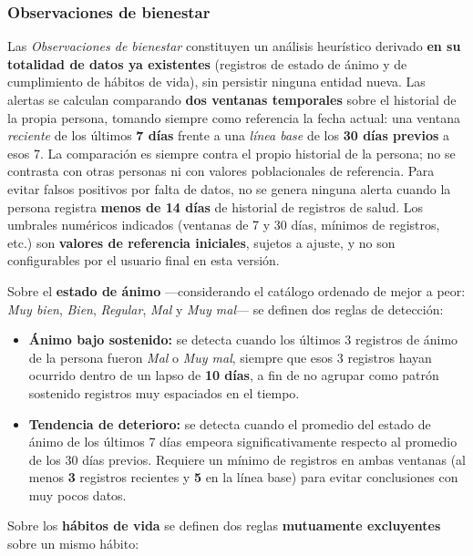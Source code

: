 \documentclass[a4paper,12pt]{article}
\begin{document}
    \subsubsection{Observaciones de bienestar}
    \par Las \textit{Observaciones de bienestar} constituyen un análisis heurístico derivado \textbf{en su totalidad de datos ya existentes} (registros de estado de ánimo y de cumplimiento de hábitos de vida), sin persistir ninguna entidad nueva. Las alertas se calculan comparando \textbf{dos ventanas temporales} sobre el historial de la propia persona, tomando siempre como referencia la fecha actual: una ventana \textit{reciente} de los últimos \textbf{7 días} frente a una \textit{línea base} de los \textbf{30 días previos} a esos 7. La comparación es siempre contra el propio historial de la persona; no se contrasta con otras personas ni con valores poblacionales de referencia. Para evitar falsos positivos por falta de datos, no se genera ninguna alerta cuando la persona registra \textbf{menos de 14 días} de historial de registros de salud. Los umbrales numéricos indicados (ventanas de 7 y 30 días, mínimos de registros, etc.) son \textbf{valores de referencia iniciales}, sujetos a ajuste, y no son configurables por el usuario final en esta versión.
    \par Sobre el \textbf{estado de ánimo} —considerando el catálogo ordenado de mejor a peor: \textit{Muy bien}, \textit{Bien}, \textit{Regular}, \textit{Mal} y \textit{Muy mal}— se definen dos reglas de detección:
    \begin{itemize}
        \item \textbf{Ánimo bajo sostenido:} se detecta cuando los últimos 3 registros de ánimo de la persona fueron \textit{Mal} o \textit{Muy mal}, siempre que esos 3 registros hayan ocurrido dentro de un lapso de \textbf{10 días}, a fin de no agrupar como patrón sostenido registros muy espaciados en el tiempo.
        \item \textbf{Tendencia de deterioro:} se detecta cuando el promedio del estado de ánimo de los últimos 7 días empeora significativamente respecto al promedio de los 30 días previos. Requiere un mínimo de registros en ambas ventanas (al menos \textbf{3} registros recientes y \textbf{5} en la línea base) para evitar conclusiones con muy pocos datos.
    \end{itemize}
    \par Sobre los \textbf{hábitos de vida} se definen dos reglas \textbf{mutuamente excluyentes} sobre un mismo hábito:
\end{document}
